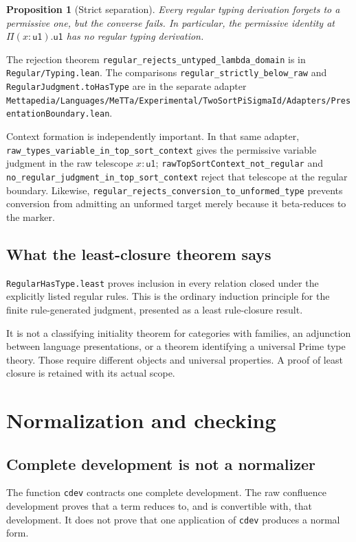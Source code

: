 \documentclass[11pt]{article}
\newtheorem{proposition}[theorem]{Proposition}
\newcommand{\code}[1]{\nolinkurl{#1}}
\newcommand{\uO}{\mathsf{u1}}
\begin{document}
\begin{proposition}[Strict separation]
Every regular typing derivation forgets to a permissive one, but the converse
fails. In particular, the permissive identity at
$\Pi(x:\uO).\uO$ has no regular typing derivation.
\end{proposition}
\noindent
The rejection theorem \code{regular_rejects_untyped_lambda_domain} is in
\code{Regular/Typing.lean}. The comparisons
\code{regular_strictly_below_raw} and \code{RegularJudgment.toHasType}
are in the separate adapter
\code{Mettapedia/Languages/MeTTa/Experimental/TwoSortPiSigmaId/Adapters/PresentationBoundary.lean}.

Context formation is independently important. In that same adapter,
\code{raw_types_variable_in_top_sort_context} gives the permissive variable
judgment in the raw telescope $x:\uO$;
\code{rawTopSortContext_not_regular} and
\code{no_regular_judgment_in_top_sort_context} reject that telescope at the
regular boundary.
Likewise, \code{regular_rejects_conversion_to_unformed_type} prevents
conversion from admitting an unformed target merely because it beta-reduces
to the marker.

\subsection{What the least-closure theorem says}

\code{RegularHasType.least} proves inclusion in every relation closed under
the explicitly listed regular rules. This is the ordinary induction
principle for the finite rule-generated judgment, presented as a least
rule-closure result.

It is not a classifying initiality theorem for categories with families,
an adjunction between language presentations, or a theorem identifying a
universal Prime type theory. Those require different objects and universal
properties. A proof of least closure is retained with its actual scope.

\section{Normalization and checking}
\label{sec:normalization}

\subsection{Complete development is not a normalizer}

The function \code{cdev} contracts one complete development.
The raw confluence development proves that a term reduces to, and is
convertible with, that development. It does not prove that one application
of \code{cdev} produces a normal form.
\end{document}
